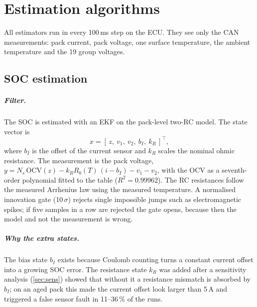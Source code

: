 \chapter{Estimation algorithms}\label{ch:estimation}

All estimators run in every 100\,ms step on the ECU. They see only the CAN measurements: pack current, pack voltage, one surface temperature, the ambient temperature and the 19 group voltages.

\section{SOC estimation}\label{sec:ekf}
\paragraph{Filter.} The SOC is estimated with an EKF on the pack-level two-RC model. The state vector is
\begin{equation}
  x = [\,z,\ v_1,\ v_2,\ b_I,\ k_R\,]^\top,
\end{equation}
where $b_I$ is the offset of the current sensor and $k_R$ scales the nominal ohmic resistance. The measurement is the pack voltage, $y = N_s\,\mathrm{OCV}(z) - k_R R_0(T)\,(i - b_I) - v_1 - v_2$, with the OCV as a seventh-order polynomial fitted to the table ($R^2 = 0.99962$). The RC resistances follow the measured Arrhenius law using the measured temperature. A normalised innovation gate (10\,$\sigma$) rejects single impossible jumps such as electromagnetic spikes; if five samples in a row are rejected the gate opens, because then the model and not the measurement is wrong.

\paragraph{Why the extra states.} The bias state $b_I$ exists because Coulomb counting turns a constant current offset into a growing SOC error. The resistance state $k_R$ was added after a sensitivity analysis (\cref{sec:sens}) showed that without it a resistance mismatch is absorbed by $b_I$; on an aged pack this made the current offset look larger than 5\,A and triggered a false sensor fault in 11--36\,\% of the runs.

